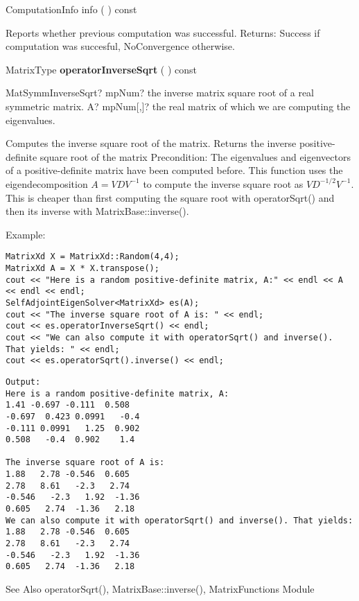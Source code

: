 \vspace{0.3cm}
ComputationInfo info  ( )  const 

Reports whether previous computation was successful. 
Returns: Success if computation was succesful, NoConvergence otherwise. 


\vspace{0.3cm}
MatrixType \textbf{operatorInverseSqrt}  ( )  const 


\vspace{0.6cm}
\begin{mpFunctionsExtract}
	\mpFunctionOne
	{MatSymmInverseSqrt? mpNum? the inverse matrix square root of a real symmetric matrix.}
	{A? mpNum[,]? the real matrix of which we are computing the eigenvalues.}
\end{mpFunctionsExtract}



Computes the inverse square root of the matrix. 
Returns the inverse positive-definite square root of the matrix
Precondition: The eigenvalues and eigenvectors of a positive-definite matrix have been computed before.
This function uses the eigendecomposition $A=V D V^{-1}$ to compute the inverse square root as $V D^{-1/2} V^{-1}$. This is cheaper than first computing the square root with operatorSqrt() and then its inverse with MatrixBase::inverse().


Example:
\begin{lstlisting}
MatrixXd X = MatrixXd::Random(4,4);
MatrixXd A = X * X.transpose();
cout << "Here is a random positive-definite matrix, A:" << endl << A << endl << endl;
SelfAdjointEigenSolver<MatrixXd> es(A);
cout << "The inverse square root of A is: " << endl;
cout << es.operatorInverseSqrt() << endl;
cout << "We can also compute it with operatorSqrt() and inverse(). That yields: " << endl;
cout << es.operatorSqrt().inverse() << endl;
\end{lstlisting}

\begin{verbatim}
Output:
Here is a random positive-definite matrix, A:
1.41 -0.697 -0.111  0.508
-0.697  0.423 0.0991   -0.4
-0.111 0.0991   1.25  0.902
0.508   -0.4  0.902    1.4

The inverse square root of A is: 
1.88   2.78 -0.546  0.605
2.78   8.61   -2.3   2.74
-0.546   -2.3   1.92  -1.36
0.605   2.74  -1.36   2.18
We can also compute it with operatorSqrt() and inverse(). That yields: 
1.88   2.78 -0.546  0.605
2.78   8.61   -2.3   2.74
-0.546   -2.3   1.92  -1.36
0.605   2.74  -1.36   2.18
\end{verbatim}
See Also operatorSqrt(), MatrixBase::inverse(), MatrixFunctions Module 


